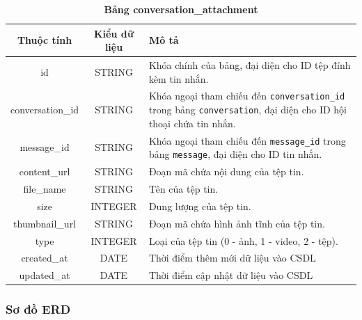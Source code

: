 \begin{table}[H]
  \caption{\bfseries \fontsize{12pt}{0pt}\selectfont Bảng conversation\_attachment}
  \centering
  \begin{tabularx}{0.9\textwidth}{|c|c|X|}
    \hline
    \textbf{Thuộc tính} & \textbf{Kiểu dữ liệu} & \textbf{Mô tả} \\
    \hline
    id & STRING & Khóa chính của bảng, đại diện cho ID tệp đính kèm tin nhắn. \\
    \hline
    conversation\_id & STRING & Khóa ngoại tham chiếu đến \texttt{conversation\_id} trong bảng \texttt{conversation}, đại diện cho ID hội thoại chứa tin nhắn. \\
    \hline
    message\_id & STRING & Khóa ngoại tham chiếu đến \texttt{message\_id} trong bảng \texttt{message}, đại diện cho ID tin nhắn. \\
    \hline
    content\_url & STRING & Đoạn mã chứa nội dung của tệp tin.\\
    \hline
    file\_name & STRING & Tên của tệp tin.\\
    \hline
    size & INTEGER & Dung lượng của tệp tin.\\
    \hline
    thumbnail\_url & STRING & Đoạn mã chứa hình ảnh tĩnh của tệp tin.\\
    \hline
    type & INTEGER & Loại của tệp tin (0 - ảnh, 1 - video, 2 - tệp). \\
    \hline
    created\_at & DATE & Thời điểm thêm mới dữ liệu vào CSDL \\
    \hline
    updated\_at & DATE & Thời điểm cập nhật dữ liệu vào CSDL \\
    \hline
  \end{tabularx}
\end{table}

\subsubsection{Sơ đồ ERD}

